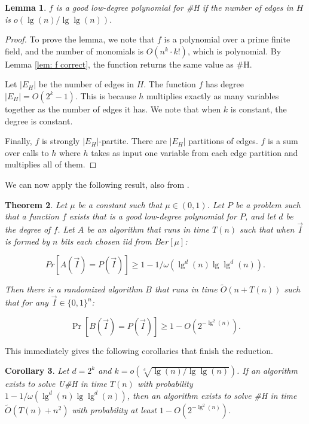 \documentclass[11pt,letterpaper,pdftex]{article}
\newtheorem{theorem}{Theorem}[section]
\newtheorem{lemma}[theorem]{Lemma}
\newtheorem{corollary}[theorem]{Corollary}
\def\Otil{\tilde{O}}
\begin{document}
\begin{lemma}\label{lem: f GLDP}
$f$ is a good low-degree polynomial for \#H if the number of edges in $H$ is $o(\lg(n)/\lg\lg(n))$.
\end{lemma}
\begin{proof}
To prove the lemma, we note that $f$ is a polynomial over a prime finite field, and the number of monomials is $O(n^k\cdot k!)$, which is polynomial. By Lemma \ref{lem: f correct}, the function returns the same value as \#H.

Let $|E_H|$ be the number of edges in $H$. The function $f$ has degree $|E_H|=O (2^k - 1) $. This is because $h$ multiplies exactly as many variables together as the number of edges it has. We note that when $k$ is constant, the degree is constant.

Finally, $f$ is strongly $|E_H|$-partite. There are $|E_H|$ partitions of edges. $f$ is a sum over calls to $h$ where $h$ takes as input one variable from each edge partition and multiplies all of them.
\end{proof}

We can now apply the following result, also from \cite{factoredProblems}.

\begin{theorem}\cite{factoredProblems}\label{thm: GLDP}
Let $\mu$ be a constant such that $\mu\in(0,1)$. Let $P$ be a problem such that a function $f$ exists that is a good low-degree polynomial for $P$, and let $d$ be the degree of $f$. Let $A$ be an algorithm that runs in time $T(n)$ such that when $\Vec{I}$ is formed by $n$ bits each chosen iid from $Ber[\mu]$:

\[
Pr[A(\Vec{I}) = P(\Vec{I})]\geq 1-1/\omega\left(\lg^d(n)\lg\lg^d(n)\right).
\]

Then there is a randomized algorithm $B$ that runs in time $\Otil(n+T(n))$ such that for any $\Vec I\in\{0,1\}^n$:

\[
\Pr[B(\Vec I) = P(\Vec I)]\geq 1 - O\left(2^{-\lg^2(n)}\right).
\]
\end{theorem}

This immediately gives the following corollaries that finish the reduction.

\begin{corollary}
Let $d=2^k$ and $k=o(\sqrt[c]{\lg(n)/\lg\lg(n) })$. If an algorithm exists to solve U\#H in time $T(n)$ with probability $1-1/\omega(\lg^d(n)\lg\lg^d(n) )$, then an algorithm exists to solve \#H in time $\Otil(T(n) + n^2)$ with probability at least $1-O \left(2^ {-\lg^2(n)}\right)$.
\end{corollary}
\end{document}
